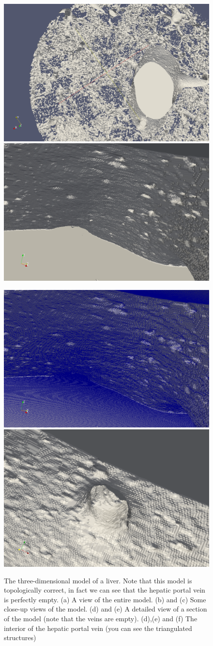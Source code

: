 \begin{figure}[htb]
   \includegraphics[width=0.49\linewidth]{images/LiverModel4.png}\hfill
   \includegraphics[width=0.49\linewidth]{images/LiverModel5.png}\newline
   
   \includegraphics[width=0.49\linewidth]{images/LiverModel6.png}\hfill
   \includegraphics[width=0.49\linewidth]{images/LiverModel7.png}
   \caption[The three-dimensional model of a liver]{The three-dimensional model of a liver. Note that this model is topologically correct, in fact we can see that the hepatic portal vein is perfectly empty. (a) A view of the entire model. (b) and (c) Some close-up views of the model. (d) and (e) A detailed view of a section of the model (note that the veins are empty). (d),(e) and (f) The interior of the hepatic portal vein (you can see the triangulated structures)}
   \label{fig:larModelLiver}
\end{figure}


